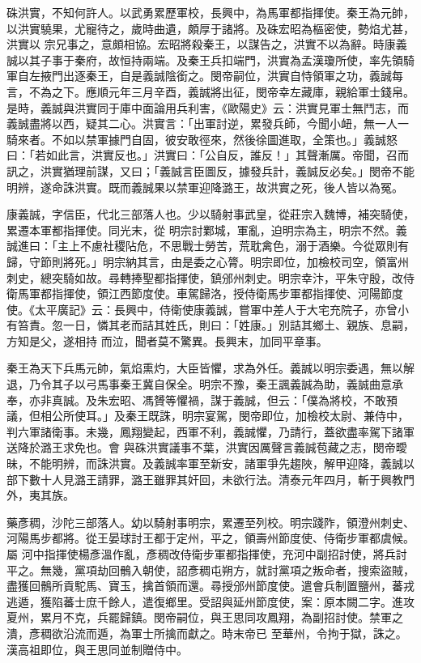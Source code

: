 \begin{pinyinscope}
 硃洪實，不知何許人。以武勇累歷軍校，長興中，為馬軍都指揮使。秦王為元帥，以洪實驍果，尤寵待之，歲時曲遺，頗厚于諸將。及硃宏昭為樞密使，勢焰尤甚，洪實以
 宗兄事之，意頗相協。宏昭將殺秦王，以謀告之，洪實不以為辭。時康義誠以其子事于秦府，故恒持兩端。及秦王兵扣端門，洪實為孟漢瓊所使，率先領騎軍自左掖門出逐秦王，自是義誠陰銜之。閔帝嗣位，洪實自恃領軍之功，義誠每言，不為之下。應順元年三月辛酉，義誠將出征，閔帝幸左藏庫，親給軍士錢帛。是時，義誠與洪實同于庫中面論用兵利害，《歐陽史》云：洪實見軍士無鬥志，而義誠盡將以西，疑其二心。洪實言：「出軍討逆，累發兵師，今聞小衄，無一人一
 騎來者。不如以禁軍據門自固，彼安敢徑來，然後徐圖進取，全策也。」義誠怒曰：「若如此言，洪實反也。」洪實曰：「公自反，誰反！」其聲漸厲。帝聞，召而訊之，洪實猶理前謀，又曰；「義誠言臣圖反，據發兵計，義誠反必矣。」閔帝不能明辨，遂命誅洪實。既而義誠果以禁軍迎降潞王，故洪實之死，後人皆以為冤。



 康義誠，字信臣，代北三部落人也。少以騎射事武皇，從莊宗入魏博，補突騎使，累遷本軍都指揮使。同光末，從
 明宗討鄴城，軍亂，迫明宗為主，明宗不然。義誠進曰：「主上不慮社稷阽危，不思戰士勞苦，荒耽禽色，溺于酒樂。今從眾則有歸，守節則將死。」明宗納其言，由是委之心膂。明宗即位，加檢校司空，領富州刺史，總突騎如故。尋轉捧聖都指揮使，鎮邠州刺史。明宗幸汴，平朱守殷，改侍衛馬軍都指揮使，領江西節度使。車駕歸洛，授侍衛馬步軍都指揮使、河陽節度使。《太平廣記》云：長興中，侍衛使康義誠，嘗軍中差人于大宅充院子，亦曾小有笞責。忽一日，憐其老而詰其姓氏，則曰：「姓康。」別詰其鄉土、親族、息嗣，方知是父，遂相持
 而泣，聞者莫不驚異。長興末，加同平章事。



 秦王為天下兵馬元帥，氣焰熏灼，大臣皆懼，求為外任。義誠以明宗委遇，無以解退，乃令其子以弓馬事秦王冀自保全。明宗不豫，秦王諷義誠為助，義誠曲意承奉，亦非真誠。及朱宏昭、馮贇等懼禍，謀于義誠，但云：「僕為將校，不敢預議，但相公所使耳。」及秦王既誅，明宗宴駕，閔帝即位，加檢校太尉、兼侍中，判六軍諸衛事。未幾，鳳翔變起，西軍不利，義誠懼，乃請行，蓋欲盡率駕下諸軍送降於潞王求免也。會
 與硃洪實議事不葉，洪實因厲聲言義誠苞藏之志，閔帝曖昧，不能明辨，而誅洪實。及義誠率軍至新安，諸軍爭先趨陜，解甲迎降，義誠以部下數十人見潞王請罪，潞王雖罪其奸回，未欲行法。清泰元年四月，斬于興教門外，夷其族。



 藥彥稠，沙陀三部落人。幼以騎射事明宗，累遷至列校。明宗踐阼，領澄州刺史、河陽馬步都將。從王晏球討王都于定州，平之，領壽州節度使、侍衛步軍都虞候。屬
 河中指揮使楊彥溫作亂，彥稠改侍衛步軍都指揮使，充河中副招討使，將兵討平之。無幾，黨項劫回鶻入朝使，詔彥稠屯朔方，就討黨項之叛命者，搜索盜賊，盡獲回鶻所貢駝馬、寶玉，擒首領而還。尋授邠州節度使。遣會兵制置鹽州，蕃戎逃遁，獲陷蕃士庶千餘人，遣復鄉里。受詔與延州節度使，案：原本闕二字。進攻夏州，累月不克，兵罷歸鎮。閔帝嗣位，與王思同攻鳳翔，為副招討使。禁軍之潰，彥稠欲沿流而遁，為軍士所擒而獻之。時末帝已
 至華州，令拘于獄，誅之。漢高祖即位，與王思同並制贈侍中。




\end{pinyinscope}
